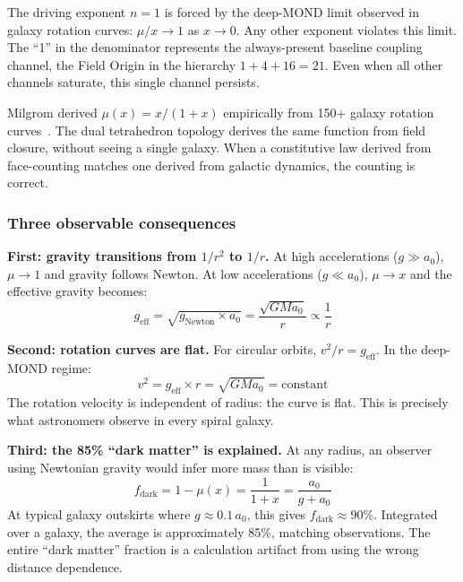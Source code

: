 \documentclass[aps,prd,preprint,superscriptaddress,showpacs,preprintnumbers,amsmath,amssymb,nofootinbib]{revtex4-2}
\begin{document}
The driving exponent $n = 1$ is forced by the deep-MOND limit observed in galaxy rotation curves: $\mu/x \to 1$ as $x \to 0$. Any other exponent violates this limit. The ``1'' in the denominator represents the always-present baseline coupling channel, the Field Origin in the hierarchy $1 + 4 + 16 = 21$. Even when all other channels saturate, this single channel persists.

Milgrom derived $\mu(x) = x/(1+x)$ empirically from 150+ galaxy rotation curves~\cite{milgrom1983}. The dual tetrahedron topology derives the same function from field closure, without seeing a single galaxy. When a constitutive law derived from face-counting matches one derived from galactic dynamics, the counting is correct.

\subsubsection*{Three observable consequences}

\textbf{First: gravity transitions from $1/r^2$ to $1/r$.} At high accelerations ($g \gg a_0$), $\mu \to 1$ and gravity follows Newton. At low accelerations ($g \ll a_0$), $\mu \to x$ and the effective gravity becomes:
\begin{equation}
g_{\text{eff}} = \sqrt{g_{\text{Newton}} \times a_0} = \frac{\sqrt{G M a_0}}{r} \propto \frac{1}{r}
\end{equation}

\textbf{Second: rotation curves are flat.} For circular orbits, $v^2/r = g_{\text{eff}}$. In the deep-MOND regime:
\begin{equation}
v^2 = g_{\text{eff}} \times r = \sqrt{G M a_0} = \text{constant}
\end{equation}
The rotation velocity is independent of radius: the curve is flat. This is precisely what astronomers observe in every spiral galaxy.

\textbf{Third: the 85\% ``dark matter'' is explained.} At any radius, an observer using Newtonian gravity would infer more mass than is visible:
\begin{equation}
f_{\text{dark}} = 1 - \mu(x) = \frac{1}{1 + x} = \frac{a_0}{g + a_0}
\end{equation}
At typical galaxy outskirts where $g \approx 0.1 \, a_0$, this gives $f_{\text{dark}} \approx 90\%$. Integrated over a galaxy, the average is approximately 85\%, matching observations. The entire ``dark matter'' fraction is a calculation artifact from using the wrong distance dependence.
\end{document}
